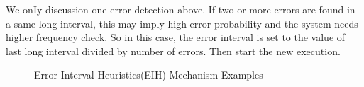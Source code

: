 \documentclass{sig-alternate}
\begin{document}
We onIy discussion one error detection above. If two or more errors are found in a same long interval, this may imply high error probability and the system needs higher frequency check. So in this case, the error interval is set to the value of last long interval divided by number of errors. Then start the new execution. 

\begin{figure}[!t]
\centering
{}
\hfil
{}
\caption{Error Interval Heuristics(EIH) Mechanism Examples}
\label{fig_adp_2}
\end{figure}

\end{document}
